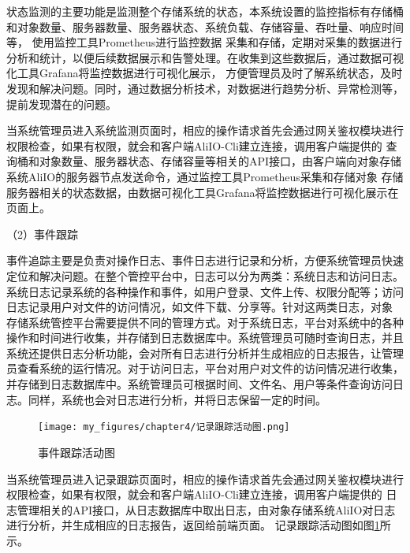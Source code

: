 状态监测的主要功能是监测整个存储系统的状态，本系统设置的监控指标有存储桶和对象数量、服务器数量、服务器状态、系统负载、存储容量、吞吐量、响应时间等，
使用监控工具Prometheus进行监控数据
采集和存储，定期对采集的数据进行分析和统计，以便后续数据展示和告警处理。在收集到这些数据后，通过数据可视化工具Grafana将监控数据进行可视化展示，
方便管理员及时了解系统状态，及时发现和解决问题。同时，通过数据分析技术，对数据进行趋势分析、异常检测等，提前发现潜在的问题。



当系统管理员进入系统监测页面时，相应的操作请求首先会通过网关鉴权模块进行权限检查，如果有权限，就会和客户端AliIO-Cli建立连接，调用客户端提供的
查询桶和对象数量、服务器状态、存储容量等相关的API接口，由客户端向对象存储系统AliIO的服务器节点发送命令，通过监控工具Prometheus采集和存储对象
存储服务器相关的状态数据\cite{kongqoji}，由数据可视化工具Grafana将监控数据进行可视化展示在页面上\cite{kong2324qoji}。



（2）事件跟踪

事件追踪主要是负责对操作日志、事件日志进行记录和分析，方便系统管理员快速定位和解决问题。在整个管控平台中，日志可以分为两类：系统日志和访问日志。
系统日志记录系统的各种操作和事件，如用户登录、文件上传、权限分配等；访问日志记录用户对文件的访问情况，如文件下载、分享等。针对这两类日志，对象
存储系统管控平台需要提供不同的管理方式。对于系统日志，平台对系统中的各种操作和时间进行收集，并存储到日志数据库中。系统管理员可随时查询日志，并且
系统还提供日志分析功能，会对所有日志进行分析并生成相应的日志报告，让管理员查看系统的运行情况。对于访问日志，平台对用户对文件的访问情况进行收集，
并存储到日志数据库中。系统管理员可根据时间、文件名、用户等条件查询访问日志。同样，系统也会对日志进行分析，并将日志保留一定的时间。



\begin{figure}[htb]
    \centering
    \texttt{[image: my\_figures/chapter4/记录跟踪活动图.png]}
    \caption{事件跟踪活动图}
    \label{fig:记录跟踪活动图}
\end{figure}

当系统管理员进入记录跟踪页面时，相应的操作请求首先会通过网关鉴权模块进行权限检查，如果有权限，就会和客户端AliIO-Cli建立连接，调用客户端提供的
日志管理相关的API接口，从日志数据库中取出日志，由对象存储系统AliIO对日志进行分析，并生成相应的日志报告，返回给前端页面。
记录跟踪活动图如图\ref{fig:记录跟踪活动图}所示。



